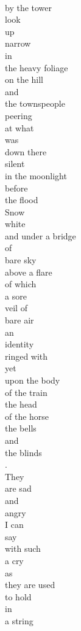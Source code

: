 \documentclass[smalldemyvopaper,11pt,twoside,onecolumn,openright,extrafontsizes]{memoir}
\begin{document}
\\by the tower
\\look
\\up
\\narrow
\\in
\\the heavy foliage
\\on the hill
\\and
\\the townspeople
\\peering
\\at what
\\was
\\down there
\\silent
\\in the moonlight
\\before
\\the flood
\\Snow
\\white
\\and under a bridge
\\of
\\bare sky
\\above a flare
\\of which
\\a sore
\\veil of
\\bare air
\\an
\\identity
\\ringed with
\\yet
\\upon the body
\\of the train
\\the head
\\of the horse
\\the bells
\\and
\\the blinds
\\.
\\They
\\are sad
\\and
\\angry
\\I can
\\say
\\with such
\\a cry
\\as
\\they are used
\\to hold
\\in
\\a string
\end{document}
